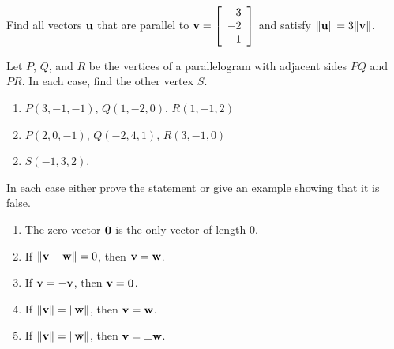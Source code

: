 \begin{multicols}{2}
\begin{ex}
Find all vectors $\textbf{u}$ that are parallel to 
$\textbf{v} = \left[
\begin{array}{r}
3\\
-2\\
1
\end{array}
\right]$ 
and satisfy $\|\textbf{u}\| = 3\|\textbf{v}\|$.
\end{ex}

\begin{ex}
Let $P$, $Q$, and $R$ be the vertices of a parallelogram with adjacent sides $PQ$ and $PR$. In each case, find the other vertex $S$.

\begin{enumerate}[label={\alph*.}]
\item $P(3, -1, -1)$, $Q(1, -2, 0)$, $R(1, -1, 2)$

\item $P(2, 0, -1)$, $Q(-2, 4, 1)$, $R(3, -1, 0)$

\end{enumerate}
\begin{sol}
\begin{enumerate}[label={\alph*.}]
\setcounter{enumi}{1}
\item  $S(-1, 3, 2)$.

\end{enumerate}
\end{sol}
\end{ex}

\begin{ex}
In each case either prove the statement or give an example showing that it is false.


\begin{enumerate}[label={\alph*.}]
\item The zero vector $\textbf{0}$ is the only vector of length 0.

\item If $\|\textbf{v} - \textbf{w}\| = 0$, then $\textbf{v} = \textbf{w}$.

\item If $\textbf{v} = -\textbf{v}$, then $\textbf{v} = \textbf{0}$.

\item If $\|\textbf{v}\| = \|\textbf{w}\|$, then $\textbf{v} = \textbf{w}$.

\item If $\|\textbf{v}\| = \|\textbf{w}\|$, then $\textbf{v} = \pm\textbf{w}$.


\end{enumerate}
\end{ex}
\end{multicols}
